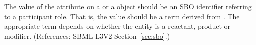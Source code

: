 The value of the attribute  on a \SpeciesReference or a
\ModifierSpeciesReference object should be an SBO identifier referring to a
participant role.  That is, the value should be a term derived from
\sboparticipantrole.  The appropriate term depends on whether the entity is
a reactant, product or modifier.  (References: SBML L3V2
Section~\ref{sec:sbo}.)
